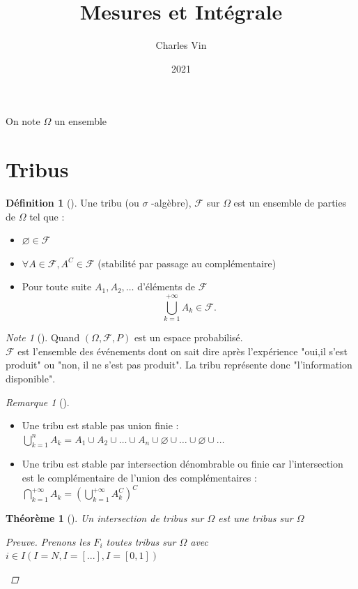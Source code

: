 \documentclass{article}
\title{Mesures et Intégrale}
\author{Charles Vin}
\date{2021}
\theoremstyle{plain}%
\newtheorem{thm}{Théorème}[section]
\theoremstyle{definition}
\newtheorem{defn}{Définition}[section]
\theoremstyle{remark}
\newtheorem*{rem}{Remarque}
\newtheorem*{note}{Note}
\begin{document}
\maketitle

On note $ \Omega  $ un ensemble
\section{Tribus}
\begin{defn}[]
    Une tribu (ou $ \sigma  $ -algèbre), $ \mathcal{F} $ sur $ \Omega  $ est un ensemble de parties de $ \Omega  $ tel que : \begin{itemize}
        \item $ \varnothing \in \mathcal{F} $ 
        \item $ \forall A \in \mathcal{F}, A^C \in \mathcal{F} $ (stabilité par passage au complémentaire)
        \item Pour toute suite $ A_1, A_2, \dots $ d'éléments de $ \mathcal{F} $  
        \[
            \bigcup_{k=1}^{+ \infty } A_k \in \mathcal{F}
        .\]
    \end{itemize}
    \begin{note}[]
        Quand $ (\Omega, \mathcal{F}, P ) $ est un espace probabilisé. \\
        $ \mathcal{F} $ est l'ensemble des événements dont on sait dire après l'expérience "oui,il s'est produit" ou "non, il ne s'est pas produit". La tribu représente donc "l'information disponible".
    \end{note}
    \begin{rem}[]
        \begin{itemize}
            \item Une tribu est stable pas union finie : $ \bigcup_{k=1}^{n} A_k = A_1 \cup A_2 \cup \dots \cup A_n \cup \varnothing \cup \dots \cup \varnothing \cup \dots  $ 
            \item Une tribu est stable par intersection dénombrable ou finie car l'intersection est le complémentaire de l'union des complémentaires : $ \bigcap_{k=1}^{+ \infty } A_k = (\bigcup_{k=1}^{+\infty } A_k^C)^C $ 
        \end{itemize}
    \end{rem}
    \begin{thm}[]
        Un intersection de tribus sur $ \Omega  $ est une tribus sur $ \Omega  $ 
        \begin{proof}[Preuve]
            Prenons les $ F_i $ toutes tribus sur $ \Omega  $ avec $ i \in I (I=N, I=[...], I=[0,1])$ \begin{itemize}

\end{itemize}
\end{proof}
\end{thm}
\end{defn}
\end{document}
